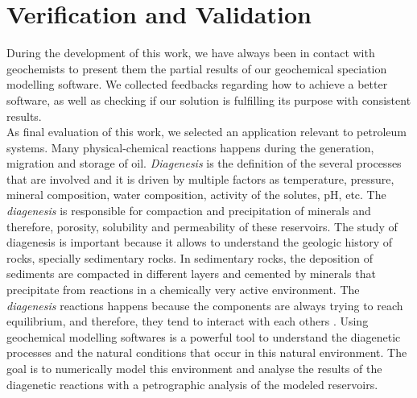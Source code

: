 
\chapter{Verification and Validation}
\label{chapter:validation}
During the development of this work, we have always been in contact with geochemists to present them the partial results of our geochemical speciation modelling software. We collected feedbacks regarding how to achieve a better software, as well as checking if our solution is fulfilling its purpose with consistent results. \\
As final evaluation of this work, we selected an application relevant to petroleum systems. Many physical-chemical reactions happens during the generation, migration and storage of oil. \emph{Diagenesis} is the definition of the several processes that are involved and it is driven by multiple factors as temperature, pressure, mineral composition, water composition, activity of the solutes, pH, etc. 
The \emph{diagenesis} is responsible for compaction and precipitation of minerals \cite{Tucker:01} and therefore, porosity, solubility and permeability of these reservoirs. The study of diagenesis is important because it allows to understand the geologic history of rocks, specially sedimentary rocks. In sedimentary rocks, the deposition of sediments are compacted in different layers and cemented by minerals that precipitate from reactions in a chemically very active environment. The \emph{diagenesis} reactions happens because the components are always trying to reach equilibrium, and therefore, they tend to interact with each others \cite{Burley:85}.
Using geochemical modelling softwares is a powerful tool to understand the diagenetic processes and the natural conditions that occur in this natural environment. The goal is to numerically model this environment and analyse the results of the diagenetic reactions with a petrographic analysis of the modeled reservoirs.

